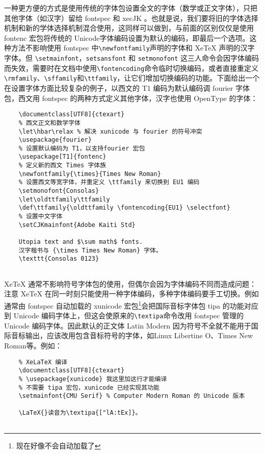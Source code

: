 一种更方便的方式是使用传统的字体包设置全文的字体（数学或正文字体），只把其他字体（如汉字）留给 fontspec 和 xecJK 。也就是说，我们要将旧的字体选择机制和新的学体选择机制混合使用，这同样可以做到，与前面的区别仅仅是使用 fontenc 宏包将传统的 Unicode字体编码设置为默认的编码，即最后一个选项。这种方法不影响使用 fontspec 中\verb|\newfontfamily|声明的字体和 XeTeX 声明的汉字字体。但 \verb|\setmainfont|，\verb|setsansfont| 和 \verb|setmonofont| 这三人命令会因字体编码而失效，需要时在文档中使用\verb|\fontencoding|命令临时切换编码，或者直接重定义\verb|\rmfamily|、\verb|\sffamily|和\verb|\ttfamily|，让它们增加切换编码的功能。下面给出一个在设置字体方面比较复杂的例子，以西文的 T1 编码为默认编码调 fourier 字体包，西文用 fontspec 的两种方式定义其他字体，汉字也使用 OpenType 的字体：
\begin{lstlisting}
    \documentclass[UTF8]{ctexart}
    % 西文正文和数学字体
    \let\hbar\relax % 解决 xunicode 与 fourier 的符号冲突
    \usepackage{fourier}
    % 设置默认编码为 T1，以支持fourier 宏包
    \usepackage[T1]{fontenc}
    % 定义新的西文 Times 字体族
    \newfontfamily{\times}{Times New Roman}
    % 设置西文等宽字体，并重定义 \ttfamily 来切换到 EU1 编码
    \setmonofont{Consolas}
    \let\oldttfamily\ttfamily
    \def\ttfamily{\oldttfamily \fontencoding{EU1} \selectfont}
    % 设置中文字体
    \setCJKmainfont{Adobe Kaiti Std}
    
    Utopia text and $\sum math$ fonts.
    汉字楷书与 {\times Times New Roman} 字体。
    \texttt{Consolas 0123}
    
\end{lstlisting}

XeTeX 通常不影响符号字体包的使用，但偶尔会因为字体编码不同而造成问题：注意 XeTeX 在同一时刻只能使用一种字体编码，多种字体编码要手工切换。例如
通常由 fontspec 自动加载的 xunicode 宏包\footnote{现在好像不会自动加载了}会把国际音标字体包 tipa 的功能对应到 Unicode 编码字体上，但这会使原来的\verb|\textipa|命令改用 fontspec 管理的 Unicode 编码字体。因此默认的正文体 Latin Modern 因为符号不全就不能用于国际音标输出，应该改用包含音标符号的字体，如Linux Libertine O、Times New Roman等。例如：

\begin{lstlisting}
    % XeLaTeX 编译
    \documentclass[UTF8]{ctexart}
    % \usepackage{xunicode} 我这里加这行才能编译
    % 不需要 tipa 宏包，xunicode 已经实现其功能
    \setmainfont{CMU Serif} % Computer Modern Roman 的 Unicode 版本
    
    \LaTeX{}读音为\textipa{["lA:tEx]}。
    
\end{lstlisting}

